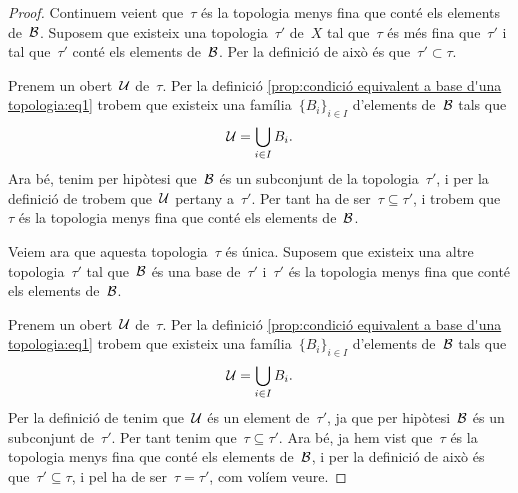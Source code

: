 \documentclass[../../Main.tex]{subfiles}
\begin{document}
\begin{proposition}
\begin{proof}
			Continuem veient que~\(\tau\) és la topologia menys fina que conté els elements de~\(\mathcal{B}\).
			Suposem que existeix una topologia~\(\tau'\) de~\(X\) tal que~\(\tau\) és més fina que~\(\tau'\) i tal que~\(\tau'\) conté els elements de~\(\mathcal{B}\).
			Per la definició de  això és que~\(\tau'\subset\tau\).

			Prenem un obert~\(\mathcal{U}\) de~\(\tau\).
			Per la definició \eqref{prop:condició equivalent a base d'una topologia:eq1} trobem que existeix una família~\(\{B_{i}\}_{i\in I}\) d'elements de~\(\mathcal{B}\) tals que
			\[
			    \mathcal{U}=\bigcup_{i\in I}B_{i}.
			\]
			Ara bé, tenim per hipòtesi que~\(\mathcal{B}\) és un subconjunt de la topologia~\(\tau'\), i per la definició de  trobem que~\(\mathcal{U}\) pertany a~\(\tau'\).
			Per tant ha de ser~\(\tau\subseteq\tau'\), i trobem que~\(\tau\) és la topologia menys fina que conté els elements de~\(\mathcal{B}\).

			Veiem ara que aquesta topologia~\(\tau\) és única.
			Suposem que existeix una altre topologia~\(\tau'\) tal que~\(\mathcal{B}\) és una base de~\(\tau'\) i~\(\tau'\) és la topologia menys fina que conté els elements de~\(\mathcal{B}\).

			Prenem un obert~\(\mathcal{U}\) de~\(\tau\).
			Per la definició \eqref{prop:condició equivalent a base d'una topologia:eq1} trobem que existeix una família~\(\{B_{i}\}_{i\in I}\) d'elements de~\(\mathcal{B}\) tals que
			\[
			    \mathcal{U}=\bigcup_{i\in I}B_{i}.
			\]
			Per la definició de  tenim que~\(\mathcal{U}\) és un element de~\(\tau'\), ja que per hipòtesi~\(\mathcal{B}\) és un subconjunt de~\(\tau'\).
			Per tant tenim que~\(\tau\subseteq\tau'\).
			Ara bé, ja hem vist que~\(\tau\) és la topologia menys fina que conté els elements de~\(\mathcal{B}\), i per la definició de  això és que~\(\tau'\subseteq\tau\), i pel  ha de ser~\(\tau=\tau'\), com volíem veure.
		\end{proof}
	\end{proposition}
\end{document}
